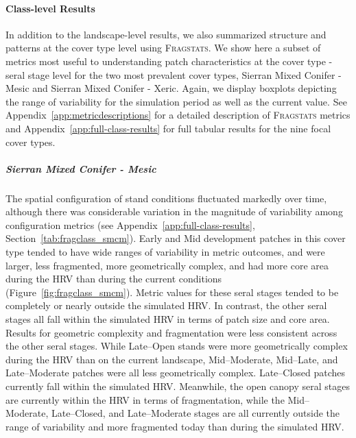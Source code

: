 



\clearpage


\paragraph{Class-level Results}

In addition to the landscape-level results, we also summarized structure and patterns at the cover type level using \textsc{Fragstats}. We show here a subset of metrics most useful to understanding patch characteristics at the cover type - seral stage level for the two most prevalent cover types, Sierran Mixed Conifer - Mesic and Sierran Mixed Conifer - Xeric. Again, we display boxplots depicting the range of variability for the simulation period as well as the current value. See Appendix~\ref{app:metricdescriptions} for a detailed description of \textsc{Fragstats} metrics and Appendix~\ref{app:full-class-results} for full tabular results for the nine focal cover types.


\subparagraph{Sierran Mixed Conifer - Mesic} %
The spatial configuration of stand conditions fluctuated markedly over time, although there was considerable variation in the magnitude of variability among configuration metrics (see Appendix~\ref{app:full-class-results}, Section~\ref{tab:fragclass_smcm}). Early and Mid development patches in this cover type tended to have wide ranges of variability in metric outcomes, and were larger, less fragmented, more geometrically complex, and had more core area during the HRV than during the current conditions (Figure~\ref{fig:fragclass_smcm}). Metric values for these seral stages tended to be completely or nearly outside the simulated HRV. 
In contrast, the other seral stages all fall within the simulated HRV in terms of patch size and core area. Results for geometric complexity and fragmentation were less consistent across the other seral stages. While Late--Open stands were more geometrically complex during the HRV than on the current landscape, Mid--Moderate, Mid--Late, and Late--Moderate patches were all less geometrically complex. Late--Closed patches currently fall within the simulated HRV. Meanwhile, the open canopy seral stages are currently within the HRV in terms of fragmentation, while the Mid--Moderate, Late--Closed, and Late--Moderate stages are all currently outside the range of variability and more fragmented today than during the simulated HRV.  

